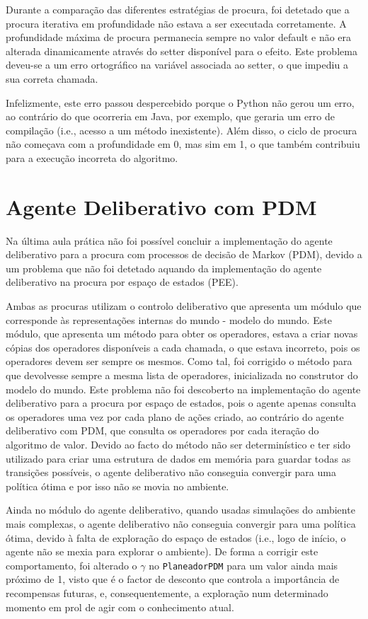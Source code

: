 Durante a comparação das diferentes estratégias de procura, foi detetado que a procura iterativa em profundidade não estava a ser executada corretamente.
A profundidade máxima de procura permanecia sempre no valor default e não era alterada dinamicamente através do setter disponível para o efeito.
Este problema deveu-se a um erro ortográfico na variável associada ao setter, o que impediu a sua correta chamada.

Infelizmente, este erro passou despercebido porque o Python não gerou um erro, ao contrário do que ocorreria em Java, por exemplo, que geraria um erro de compilação (i.e., acesso a um método inexistente).
Além disso, o ciclo de procura não começava com a profundidade em 0, mas sim em 1, o que também contribuiu para a execução incorreta do algoritmo.

\section{Agente Deliberativo com PDM}\label{sec:agente-deliberativo-com-pdm}

Na última aula prática não foi possível concluir a implementação do agente deliberativo para a procura com processos de decisão de Markov (PDM), devido a um problema que não foi detetado aquando da implementação do agente deliberativo na procura por espaço de estados (PEE).

Ambas as procuras utilizam o controlo deliberativo que apresenta um módulo que corresponde às representações internas do mundo - modelo do mundo.
Este módulo, que apresenta um método para obter os operadores, estava a criar novas cópias dos operadores disponíveis a cada chamada, o que estava incorreto, pois os operadores devem ser sempre os mesmos.
Como tal, foi corrigido o método para que devolvesse sempre a mesma lista de operadores, inicializada no construtor do modelo do mundo.
Este problema não foi descoberto na implementação do agente deliberativo para a procura por espaço de estados, pois o agente apenas consulta os operadores uma vez por cada plano de ações criado, ao contrário do agente deliberativo com PDM, que consulta os operadores por cada iteração do algoritmo de valor.
Devido ao facto do método não ser determinístico e ter sido utilizado para criar uma estrutura de dados em memória para guardar todas as transições possíveis, o agente deliberativo não conseguia convergir para uma política ótima e por isso não se movia no ambiente.

Ainda no módulo do agente deliberativo, quando usadas simulações do ambiente mais complexas, o agente deliberativo não conseguia convergir para uma política ótima, devido à falta de exploração do espaço de estados (i.e., logo de início, o agente não se mexia para explorar o ambiente).
De forma a corrigir este comportamento, foi alterado o $\gamma$ no \texttt{PlaneadorPDM} para um valor ainda mais próximo de 1, visto que é o factor de desconto que controla a importância de recompensas futuras, e, consequentemente, a exploração num determinado momento em prol de agir com o conhecimento atual.


